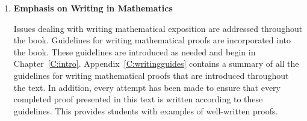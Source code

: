 \begin{enumerate}
\item \textbf{Emphasis on Writing in Mathematics}

Issues dealing with writing mathematical exposition are addressed throughout the book.  Guidelines for writing mathematical proofs are incorporated into the book.  These guidelines are introduced as needed and begin in Chapter~\ref{C:intro}.  Appendix~\ref{C:writingguides}
 contains a summary of all the guidelines for writing mathematical proofs that are introduced throughout the text.  In addition, every attempt has been made to ensure that every completed proof presented in this text is written according to these guidelines.  This provides students with examples of well-written proofs.

%


\end{enumerate}
